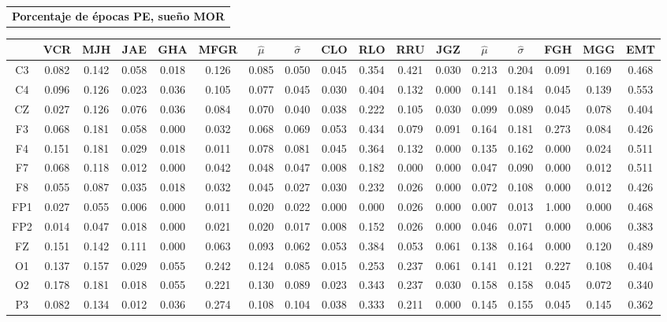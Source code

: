 \documentclass[12pt,a4paper]{mitthesis}
\begin{document}

\begin{SidewaysFigure}
\centering
\begin{tabular}{c}
\textbf{Porcentaje de \'epocas PE, sue\~no MOR}
\vspace{1em}
\end{tabular}
\begin{tabular}{c||ccccc|cc||cccc|cc||ccc}
& VCR & MJH & JAE & GHA & MFGR &$\widehat{\mu}$ & $\widehat{\sigma}$
& CLO & RLO & RRU & JGZ &$\widehat{\mu}$ & $\widehat{\sigma}$
& FGH & MGG & EMT \\
\hline
C3&0.082&0.142&0.058&0.018&0.126&0.085&0.050&0.045&0.354&0.421&0.030&0.213&0.204&0.091&0.169&0.468 \\
C4&0.096&0.126&0.023&0.036&0.105&0.077&0.045&0.030&0.404&0.132&0.000&0.141&0.184&0.045&0.139&0.553 \\
CZ&0.027&0.126&0.076&0.036&0.084&0.070&0.040&0.038&0.222&0.105&0.030&0.099&0.089&0.045&0.078&0.404 \\
F3&0.068&0.181&0.058&0.000&0.032&0.068&0.069&0.053&0.434&0.079&0.091&0.164&0.181&0.273&0.084&0.426 \\
F4&0.151&0.181&0.029&0.018&0.011&0.078&0.081&0.045&0.364&0.132&0.000&0.135&0.162&0.000&0.024&0.511 \\
F7&0.068&0.118&0.012&0.000&0.042&0.048&0.047&0.008&0.182&0.000&0.000&0.047&0.090&0.000&0.012&0.511 \\
F8&0.055&0.087&0.035&0.018&0.032&0.045&0.027&0.030&0.232&0.026&0.000&0.072&0.108&0.000&0.012&0.426 \\
FP1&0.027&0.055&0.006&0.000&0.011&0.020&0.022&0.000&0.000&0.026&0.000&0.007&0.013&1.000&0.000&0.468 \\
FP2&0.014&0.047&0.018&0.000&0.021&0.020&0.017&0.008&0.152&0.026&0.000&0.046&0.071&0.000&0.006&0.383 \\
FZ&0.151&0.142&0.111&0.000&0.063&0.093&0.062&0.053&0.384&0.053&0.061&0.138&0.164&0.000&0.120&0.489 \\
O1&0.137&0.157&0.029&0.055&0.242&0.124&0.085&0.015&0.253&0.237&0.061&0.141&0.121&0.227&0.108&0.404 \\
O2&0.178&0.181&0.018&0.055&0.221&0.130&0.089&0.023&0.343&0.237&0.030&0.158&0.158&0.045&0.072&0.340 \\
P3&0.082&0.134&0.012&0.036&0.274&0.108&0.104&0.038&0.333&0.211&0.000&0.145&0.155&0.045&0.145&0.362 \\

\end{tabular}
\end{SidewaysFigure}
\end{document}
